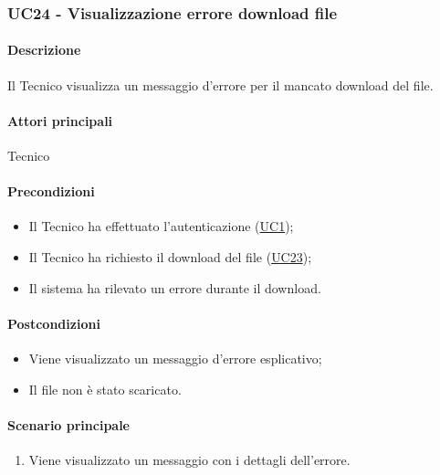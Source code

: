 \subsubsection{UC24 - Visualizzazione errore download file}\label{UC24}
\paragraph*{Descrizione}
Il Tecnico visualizza un messaggio d'errore per il mancato download del file.

\paragraph*{Attori principali}
Tecnico

\paragraph*{Precondizioni}
\begin{itemize}
  \item Il Tecnico ha effettuato l'autenticazione (\hyperref[UC1]{UC1});
  \item Il Tecnico ha richiesto il download del file (\hyperref[UC23]{UC23});
  \item Il sistema ha rilevato un errore durante il download.
\end{itemize}

\paragraph*{Postcondizioni}
\begin{itemize}
  \item Viene visualizzato un messaggio d'errore esplicativo;
  \item Il file non è stato scaricato.
\end{itemize}

\paragraph*{Scenario principale}
\begin{enumerate}
  \item Viene visualizzato un messaggio con i dettagli dell'errore.
\end{enumerate}
